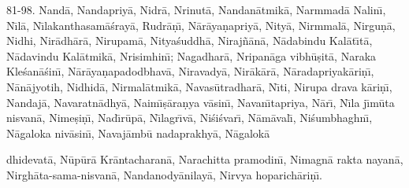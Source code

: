81-98. Nand\=a, Nandapriy\=a, Nidr\=a, Nrinut\=a, Nandan\=atmik\=a, Narmmad\=a Nalin\={\i}, N\={\i}l\=a, N\={\i}lakanthasam\=a\'sray\=a, Rudr\=a\d{n}\={\i}, N\=ar\=aya\d{n}apriy\=a, Nity\=a, Nirmmal\=a, Nirgu\d{n}\=a, Nidhi, Nir\=adh\=ar\=a, Nirupam\=a, Nitya\'suddh\=a, Niraj\~n\=an\=a, N\=adabindu Kal\=at\={\i}t\=a, N\=adavindu Kal\=atmik\=a, Nrisimhin\={\i}; Nagadhar\=a, Nripan\=aga vibh\=u\d{s}it\=a, Naraka Kle\'san\=a\'sin\={\i}, N\=ar\=aya\d{n}apadodbhav\=a, Niravady\=a, Nir\=ak\=ar\=a, N\=aradapriyak\=ari\d{n}\={\i}, N\=an\=ajyotih, Nidhid\=a, Nirmal\=atmik\=a, Navas\=utradhar\=a, N\={\i}ti, Nirupa drava k\=ari\d{n}\={\i}, Nandaj\=a, Navaratn\=adhy\=a, Naim\={\i}\d{s}\=ara\d{n}ya v\=asin\={\i}, Navan\={\i}tapriya, N\=ar\={\i}, N\={\i}la j\={\i}m\=uta nisvan\=a, Nime\d{s}i\d{n}\={\i}, Nad\={\i}r\=up\=a, N\={\i}lagr\={\i}v\=a, Ni\'si\'svar\={\i}, N\=am\=aval\={\i}, Ni\'sumbhaghn\={\i}, N\=agaloka niv\=asin\={\i}, Navaj\=amb\=u nadaprakhy\=a, N\=agalok\=a

dhidevat\=a, N\=up\=ur\=a Kr\=antacharan\=a, Narachitta pramodin\={\i}, Nimagn\=a rakta nayan\=a, Nirgh\=ata-sama-nisvan\=a, Nandanody\=anilay\=a, Nirvya hoparich\=ari\d{n}\={\i}.


